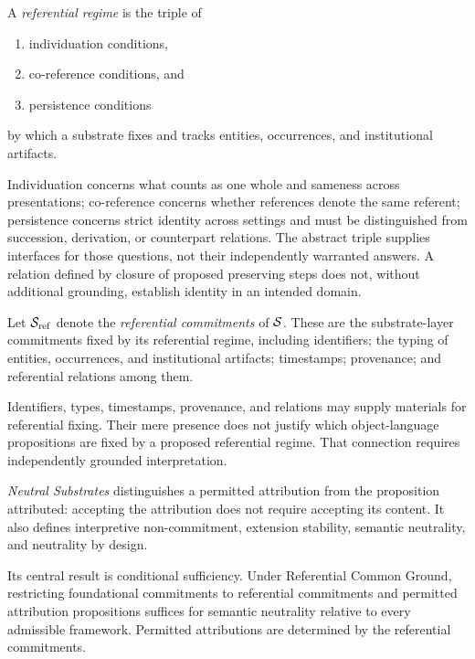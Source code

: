 \begin{definition}
  \label{se100.def.ReferentialRegime}
  A \emph{referential regime} is the triple of
  \begin{enumerate}
    \item individuation conditions,
    \item co-reference conditions, and
    \item persistence conditions
  \end{enumerate}
  by which a substrate fixes and tracks entities, occurrences, and institutional
  artifacts.
\end{definition}

Individuation concerns what counts as one whole and sameness across
presentations; co-reference concerns whether references denote the same
referent; persistence concerns strict identity across settings and must
be distinguished from succession, derivation, or counterpart relations.
The abstract triple supplies interfaces for those questions, not their
independently warranted answers.
A relation defined by closure of
proposed preserving steps does not,
without additional grounding,
establish identity in an intended domain.

\begin{definition}
  \label{se100.def.ReferentialCommitments}
  Let $\mathcal{S}_{\mathrm{ref}}$ denote the \emph{referential commitments} of $\mathcal{S}$.
  These are the substrate-layer commitments fixed by its referential regime,
  including identifiers;
  the typing of entities, occurrences, and institutional artifacts;
  timestamps;
  provenance;
  and referential relations among them.
\end{definition}

Identifiers, types, timestamps, provenance, and relations may supply
materials for referential fixing.
Their mere presence does not justify
which object-language propositions are
fixed by a proposed referential regime.
That connection requires independently grounded interpretation.

\emph{Neutral Substrates} distinguishes a permitted attribution from
the proposition attributed: accepting the attribution does not require
accepting its content.
It also defines interpretive non-commitment,
extension stability, semantic neutrality, and neutrality by design.

Its central result is conditional sufficiency.
Under Referential Common
Ground, restricting foundational commitments to referential commitments
and permitted attribution propositions suffices for semantic neutrality
relative to every admissible framework.
Permitted attributions are
determined by the referential commitments.

